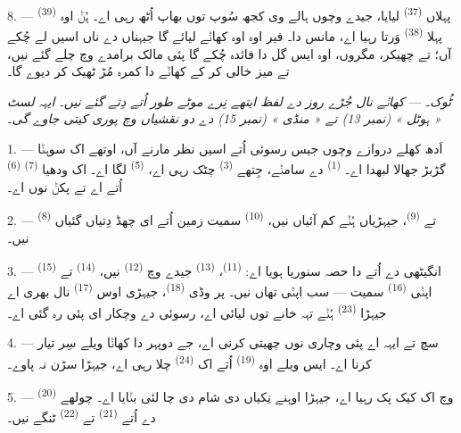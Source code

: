 8. ---  \textsuperscript{(39)} پہلاں 
\textsuperscript{(37)} لیایا، جیدے وچوں ہالے وی کجھ سُوپ توں بھاپ اُٹھ رہی اے۔ ہُݨ
اوہ پہلا  \textsuperscript{(38)} وَرتا رہیا اے، مانس دا۔ فیر اوہ اوہ
کھاݨے لیائے گا جیہناں دے ناں اسیں لے چُکے آں؛ تے چھیکر،  مگروں،
اوہ ایس گل دا فائدہ چُکے گا پئی مالک برامدے وچ چلے گئے نیں، تے میز خالی کر کے
کھاݨے دا کمرہ مُڑ ٹھیک کر دیوے گا۔

\textit{ٹُوک۔} --- \textit{کھاݨے نال جُڑے روز دے لفظ ایتھے نِرے موٹے طور اُتے
دِتے گئے نیں۔ ایہہ لسٹ « ہوٹل » (نمبر 13) تے « منڈی » (نمبر 15) دے دو نقشیاں وچ
پوری کیتی جاوے گی۔}

\VUsaut{4.6mm}
\VUsaut{3.0mm}

1. --- اَدھ کھلے دروازے وچوں جیس رسوئی اُتے اسیں نظر مارنے آں، اوتھے اک سوہݨا
گڑبڑ جھالا لبھدا اے۔  \textsuperscript{(1)} دے سامݨے، جِتھے
 \textsuperscript{(3)} چٹک رہی اے، 
\textsuperscript{(5)} لگا اے۔ اک ودھیا  \textsuperscript{(7)}
 \textsuperscript{(6)} اُتے اے تے پکݨ نوں اے۔

2. ---  \textsuperscript{(8)} تے 
\textsuperscript{(9)}، جیہڑیاں ہُݨے کم آئیاں نیں، 
\textsuperscript{(10)} سمیت زمین اُتے ای چھڈ دِتیاں گئیاں نیں۔

3. --- انگیٹھی دے اُتے دا حصہ سنوریا ہویا اے: 
\textsuperscript{(11)}،  \textsuperscript{(13)} جیدے وچ
 \textsuperscript{(12)} نیں،  \textsuperscript{(14)}
تے  \textsuperscript{(15)} اپݨی 
\textsuperscript{(16)} سمیت — سب اپݨی تھاں نیں۔ پر وڈی 
\textsuperscript{(18)}، جیہڑی اوس  \textsuperscript{(17)} نال بھری اے
جیہڑا  \textsuperscript{(23)} ہُݨے تہہ خانے توں لیائی اے، رسوئی دے
وچکار ای پئی رہ گئی اے۔

4. --- سچ تے ایہہ اے پئی وچاری نوں چھیتی کرنی اے، جے دوپہر دا کھاݨا ویلے سِر
تیار کرنا اے۔ ایس ویلے اوہ  \textsuperscript{(19)} اُتے اک
 \textsuperscript{(24)} چلا رہی اے، جیہڑا سڑن نہ پاوے۔

5. ---  \textsuperscript{(20)} وچ اک کیک پک رہیا اے، جیہڑا اوہنے
نِکیاں دی شام دی چا لئی بݨایا اے۔ چولھے دے اُتے 
\textsuperscript{(21)} تے  \textsuperscript{(22)} ٹنگے نیں۔


